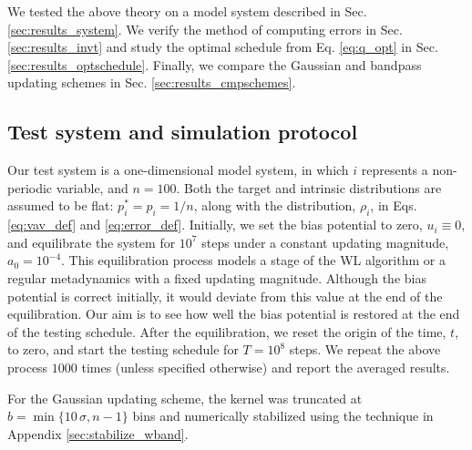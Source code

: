 \documentclass[reprint, floatfix]{revtex4-1}
\begin{document}
We tested the above theory on a model system
described in Sec. \ref{sec:results_system}.
%
We verify the method of computing errors
in Sec. \ref{sec:results_invt}
%
and study the optimal schedule from
Eq. \eqref{eq:q_opt}
in Sec. \ref{sec:results_optschedule}.
%
Finally, we compare the Gaussian and
bandpass updating schemes %
in Sec. \ref{sec:results_cmpschemes}.



\subsection{\label{sec:results_system}
Test system and simulation protocol}



Our test system is a one-dimensional model system, in which
$i$ represents a non-periodic variable,
and $n = 100$.
%
Both the target and intrinsic distributions
are assumed to be flat:
$p^*_i = p_i = 1/n$,
along with the distribution, $\rho_i$, in Eqs.
\eqref{eq:vav_def} and \eqref{eq:error_def}.
%
%
Initially,
we set the bias potential to zero,
$u_i \equiv 0$,
and equilibrate the system for $10^7$ steps
under a constant updating magnitude,
$a_0 = 10^{-4}$.
%
This equilibration process models
a stage of the WL algorithm or
a regular metadynamics
with a fixed updating magnitude.
%
Although the bias potential is correct initially,
it would deviate from this value
at the end of the equilibration.
%
Our aim is to see how well
the bias potential is restored
at the end of the testing schedule.
%
After the equilibration,
we reset the origin of the time, $t$, to zero,
and start the testing schedule
for $T = 10^8$ steps.
%
We repeat the above process $1000$ times (unless specified otherwise)
and report the averaged results.



For the Gaussian updating scheme,
the kernel was truncated at
$b = \min\{10 \, \sigma, n - 1\}$ bins
and numerically stabilized
using the technique
in Appendix \ref{sec:stabilize_wband}.
\end{document}

